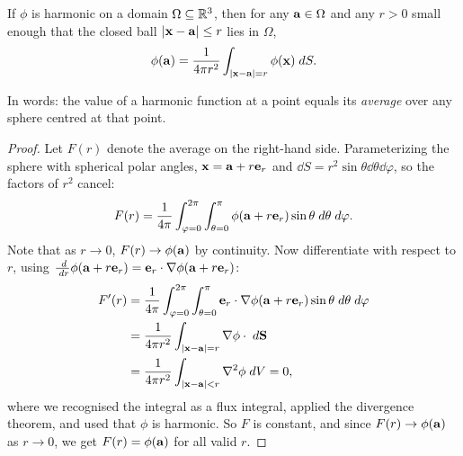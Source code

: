 \documentclass[a4paper]{scrartcl}
\begin{document}
\begin{theorem}
	If $\phi$ is harmonic on a domain $\Omega \subseteq \mathbb{R}^3$, then for any $\mathbf{a} \in \Omega$ and any $r > 0$ small enough that the closed ball $|\mathbf{x} - \mathbf{a}| \leq r$ lies in $\Omega$,
	$$
	\phi(\mathbf{a}) = \frac{1}{4 \pi r^2}\int_{|\mathbf{x} - \mathbf{a}| = r} \phi(\mathbf{x}) \; d S.
	$$
\end{theorem}

In words: the value of a harmonic function at a point equals its \emph{average} over any sphere centred at that point.

\begin{proof}
	Let $F(r)$ denote the average on the right-hand side. Parameterizing the sphere with spherical polar angles, $\mathbf{x} = \mathbf{a} + r \mathbf{e}_r$ and $\dd S = r^2 \sin \theta \dd \theta \dd \varphi$, so the factors of $r^2$ cancel:
	$$
	F(r) = \frac{1}{4 \pi} \int_{\varphi = 0}^{2\pi}\int_{\theta = 0}^{\pi} \phi(\mathbf{a} + r \mathbf{e}_r) \sin \theta \; d \theta \; d \varphi.
	$$
	Note that as $r \to 0$, $F(r) \to \phi(\mathbf{a})$ by continuity. Now differentiate with respect to $r$, using $\frac{\; d}{\; d r} \phi(\mathbf{a} + r \mathbf{e}_r) = \mathbf{e}_r \cdot \nabla \phi(\mathbf{a} + r \mathbf{e}_r)$:
	\begin{align*}
		F'(r) &= \frac{1}{4 \pi} \int_{\varphi = 0}^{2 \pi} \int_{\theta = 0}^\pi \mathbf{e}_r \cdot \nabla \phi(\mathbf{a} + r \mathbf{e}_r) \sin \theta \; d \theta \; d \varphi \\
		&= \frac{1}{4 \pi r^2} \int_{|\mathbf{x} - \mathbf{a}| = r} \nabla \phi \cdot \; d \mathbf{S} \\
		&= \frac{1}{4 \pi r^2} \int_{|\mathbf{x} - \mathbf{a}| < r} \nabla^2 \phi \; d V = 0,
	\end{align*}
	where we recognised the integral as a flux integral, applied the divergence theorem, and used that $\phi$ is harmonic. So $F$ is constant, and since $F(r) \to \phi(\mathbf{a})$ as $r \to 0$, we get $F(r) = \phi(\mathbf{a})$ for all valid $r$.
\end{proof}
\end{document}

